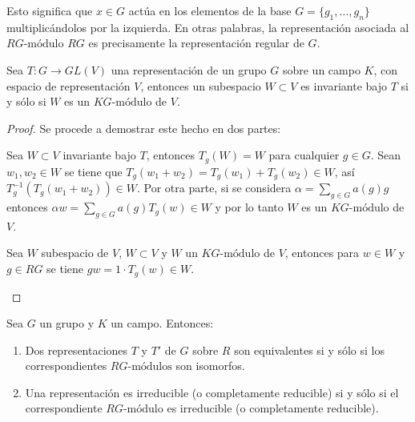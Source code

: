   Esto significa que $x \in G$ actúa en los elementos de la base $G = \{ g_1, \dots, g_n \}$ multiplicándolos por la izquierda. En otras palabras, la representación asociada al $RG\mbox{-módulo}$ $RG$ es precisamente la representación regular de $G$. 
\begin{lema}
  Sea $T \colon G \to GL(V)$ una representación de un grupo $G$ sobre un campo $K$, con espacio de representación $V$, entonces un subespacio $W \subset V$ es invariante bajo $T$ si y sólo si $W$ es un $KG\mbox{-módulo}$ de $V$. 
  \end{lema}
  \begin{proof}
  Se procede a demostrar este hecho en dos partes:
  \begin{bulletList}
  \item Sea $W \subset V$ invariante bajo $T$, entonces $T_{g}(W) = W$ para cualquier $g \in G$. Sean $w_1, w_2 \in W$ se tiene que $T_{g}(w_1 + w_2) = T_{g}(w_1) + T_{g}(w_2) \in W$, así $T_{g}^{-1}(T_{g}(w_1 + w_2)) \in W$. Por otra parte, si se considera $\alpha = \sum_{g \in G}a(g)g$ entonces $\alpha w = \sum_{g \in G}a(g)T_g(w) \in W$ y por lo tanto $W$ es un $KG\mbox{-módulo}$ de $V$.
  \item Sea $W$ subespacio de $V$, $W \subset V$ y $W$ un $KG\mbox{-módulo}$ de $V$, entonces para $w \in W$ y $g \in RG$ se tiene $gw = 1\cdot T_g(w) \in W$. \qedhere
  \end{bulletList} 
  \end{proof}
  
  \begin{teorema}
  Sea $G$ un grupo y $K$ un campo. Entonces:
  \begin{enumerate}
  \item Dos representaciones $T$ y $T'$ de $G$ sobre $R$ son equivalentes si y sólo si los correspondientes $RG\mbox{-módulos}$ son isomorfos.
  \item Una representación es irreducible (o completamente reducible) si y sólo si el correspondiente $RG\mbox{-módulo}$ es irreducible (o completamente reducible).
  \end{enumerate}
  \end{teorema}
  
